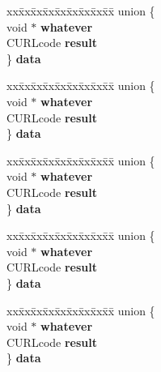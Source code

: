 \begin{DoxyCompactItemize}
\begin{tabbing}
\end{tabbing}\item 
\mbox{\label{structCURLMsg_ab65ff232a843ff4254b2dcca09cb296a}} 
\begin{tabbing}
xx\=xx\=xx\=xx\=xx\=xx\=xx\=xx\=xx\=\kill
union \{\\
\>void $\ast$ {\bfseries whatever}\\
\>CURLcode {\bfseries result}\\
\} {\bfseries data}\\

\end{tabbing}\item 
\mbox{\label{structCURLMsg_a3c4a64d67cc47609001e4578f1dc8409}} 
\begin{tabbing}
xx\=xx\=xx\=xx\=xx\=xx\=xx\=xx\=xx\=\kill
union \{\\
\>void $\ast$ {\bfseries whatever}\\
\>CURLcode {\bfseries result}\\
\} {\bfseries data}\\

\end{tabbing}\item 
\mbox{\label{structCURLMsg_abcb7c1d39db954ac3e45593430f8e65e}} 
\begin{tabbing}
xx\=xx\=xx\=xx\=xx\=xx\=xx\=xx\=xx\=\kill
union \{\\
\>void $\ast$ {\bfseries whatever}\\
\>CURLcode {\bfseries result}\\
\} {\bfseries data}\\

\end{tabbing}\item 
\mbox{\label{structCURLMsg_a428530c4df2d1b992254a1d1d59c3b1f}} 
\begin{tabbing}
xx\=xx\=xx\=xx\=xx\=xx\=xx\=xx\=xx\=\kill
union \{\\
\>void $\ast$ {\bfseries whatever}\\
\>CURLcode {\bfseries result}\\
\} {\bfseries data}\\

\end{tabbing}\item 
\mbox{\label{structCURLMsg_a3cfe3e2ce82ad49d80846b2ebd6afe8c}} 
\begin{tabbing}
xx\=xx\=xx\=xx\=xx\=xx\=xx\=xx\=xx\=\kill
union \{\\
\>void $\ast$ {\bfseries whatever}\\
\>CURLcode {\bfseries result}\\
\} {\bfseries data}\\


\end{tabbing}
\end{DoxyCompactItemize}
